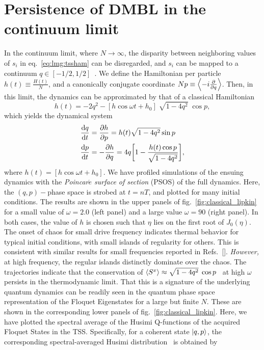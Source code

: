 \documentclass[%
reprint,
superscriptaddress,
amsmath,amssymb,
aps,
prb,
showkeys,
]{revtex4-2}
\begin{document}
\section{\label{sec:level4}Persistence of DMBL in the continuum limit}
In the continuum limit, where $N\rightarrow\infty$, the disparity between neighboring values of $s_i$ in eq.~\ref{eq:lmg:tssham} can be disregarded, and $s_i$ can be mapped to a continuum $q\in \left[-1/2, 1/2\right]$~\cite{mori_prethermalization_2019}. We define	the Hamiltonian per particle $h(t)\equiv \frac{H(t)}{N}$, and a canonically conjugate coordinate $Np\equiv \expval{-i\pdv{}{q}}$. Then, in this limit, the dynamics can be approximated by that of a classical Hamiltonian~\cite{sciolla_quantum_2010}
\begin{equation}
	h(t) = -2 q^2 - \left[h\cos{\omega t} + h_0\right]\;\sqrt{1-4q^2}\;\cos{p},
	\label{eq:class:ham}
\end{equation}
which yields the dynamical system 
\begin{align}
	\dv{q}{t} &= \pdv{h}{p} = h(t)\sqrt{1-4q^2}\sin{p}\nonumber \\
	\dv{p}{t} &= -\pdv{h}{q} = 4q\bigg[1-\frac{h(t)\cos{p}}{\sqrt{1-4q^2}}\bigg],
	\label{eq:class:poinc}
\end{align}
where $h(t) = \left[h\cos{\omega t} + h_0\right]$. We have profiled simulations of the ensuing dynamics with the \emph{Poincar$\acute{e}$ surface of section} (PSOS) of the full dynamics. Here, the $\left(q,p\right)-$phase space is strobed at $t=nT$, and plotted for many initial conditions. The results are shown in the upper panels of fig.~\ref{fig:classical_lipkin} for a small value of $\omega=2.0$ (left panel) and a large value $\omega=90$ (right panel). In both cases, the value of $h$ is chosen such that $\eta$ lies on the first root of $J_0(\eta)$. The onset of chaos for small drive frequency indicates thermal behavior for typical initial conditions, with small islands of regularity for others. This is consistent with similar results for small frequencies reported in Refs.~[\cite{russomanno_thermalization_2015, Kidd2019}]. \emph{However,} at high frequency, the regular islands distinctly dominate over the chaos. The trajectories indicate that the conservation of $\expval{S^x}\approx \sqrt{1-4q^2}\;\cos{p}$~\cite{mori_prethermalization_2019} at high $\omega$ persists in the thermodynamic limit.
That this is a signature of the underlying quantum dynamics can be readily seen in the quantum phase space representation of the Floquet Eigenstates for a large but finite $N$. These are shown in the corresponding lower panels of fig.~\ref{fig:classical_lipkin}. Here, we have plotted the spectral average of the Husimi Q-functions of the acquired Floquet States in the TSS. Specifically, for a coherent state $\ket{q,p}$, the corresponding spectral-averaged Husimi distribution~\cite{husimi} is obtained by 
\end{document}
